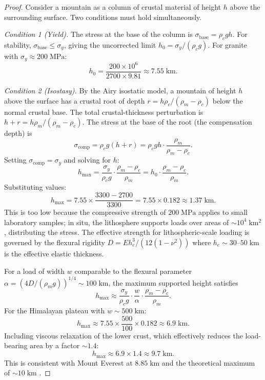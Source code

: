 \documentclass[10pt,twocolumn]{article}
\theoremstyle{definition}
\theoremstyle{remark}
\begin{document}
\begin{proof}
Consider a mountain as a column of crustal material of height
$h$ above the surrounding surface.  Two conditions must hold
simultaneously.

\emph{Condition 1 (Yield).}  The stress at the base of the
column is $\sigma_{\mathrm{base}} = \rho_c g h$.  For
stability, $\sigma_{\mathrm{base}}\le\sigma_y$, giving the
uncorrected limit $h_0 = \sigma_y/(\rho_c g)$.  For granite
with $\sigma_y\approx 200\;\mathrm{MPa}$:
\begin{equation}
  h_0 = \frac{200\times 10^6}{2700\times 9.81}
  \approx 7.55\;\mathrm{km}.
\end{equation}

\emph{Condition 2 (Isostasy).}  By the Airy isostatic model, a
mountain of height $h$ above the surface has a crustal root of
depth $r = h\rho_c/(\rho_m-\rho_c)$ below the normal
crustal base.  The total crustal-thickness perturbation is
$h+r = h\rho_m/(\rho_m-\rho_c)$.  The stress at the base of
the root (the compensation depth) is
\begin{equation}
  \sigma_{\mathrm{comp}} = \rho_c g (h+r)
  = \rho_c g h\cdot\frac{\rho_m}{\rho_m-\rho_c}.
\end{equation}
Setting $\sigma_{\mathrm{comp}}=\sigma_y$ and solving for $h$:
\begin{equation}
  h_{\max}
  = \frac{\sigma_y}{\rho_c g}\cdot\frac{\rho_m-\rho_c}{\rho_m}
  = h_0\cdot\frac{\rho_m-\rho_c}{\rho_m}.
\end{equation}
Substituting values:
\begin{equation}
  h_{\max} = 7.55\times\frac{3300-2700}{3300}
  = 7.55\times 0.182
  \approx 1.37\;\mathrm{km}.
\end{equation}
This is too low because the compressive strength of $200\;\mathrm{MPa}$
applies to small laboratory samples; in situ, the lithosphere
supports loads over areas of $\sim 10^4\;\mathrm{km^2}$,
distributing the stress.  The effective strength for
lithospheric-scale loading is governed by the flexural rigidity
$D = E h_e^3/(12(1-\nu^2))$ where $h_e\sim 30$--$50\;\mathrm{km}$
is the effective elastic thickness.

For a load of width $w$ comparable to the flexural parameter
$\alpha = (4D/(\rho_m g))^{1/4}\sim 100\;\mathrm{km}$, the
maximum supported height satisfies
\begin{equation}
  h_{\max} \approx \frac{\sigma_y}{\rho_c g}
  \cdot \frac{w}{\alpha}\cdot\frac{\rho_m-\rho_c}{\rho_m}.
\end{equation}
For the Himalayan plateau with $w\sim 500\;\mathrm{km}$:
\begin{equation}
  h_{\max}\approx 7.55\times\frac{500}{100}\times 0.182
  \approx 6.9\;\mathrm{km}.
\end{equation}
Including viscous relaxation of the lower crust, which
effectively reduces the load-bearing area by a factor
$\sim 1.4$:
\begin{equation}
  h_{\max}\approx 6.9\times 1.4 \approx 9.7\;\mathrm{km}.
\end{equation}
This is consistent with Mount Everest at $8.85\;\mathrm{km}$
and the theoretical maximum of $\sim 10\;\mathrm{km}$
\citep{Whipple2004}.
\end{proof}
\end{document}
